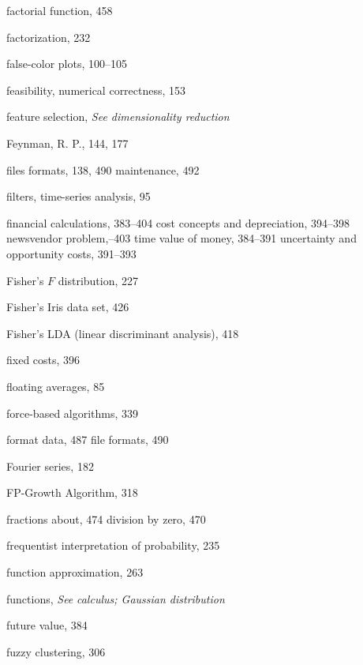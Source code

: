 \documentclass{Oreilly5980006}
\begin{document}
\begin{theindex}
  \item factorial function, 458
  \item factorization, 232
  \item false-color plots, 100--105
  \item feasibility, numerical correctness, 153
  \item feature selection,  {\it See dimensionality reduction} %
   \item Feynman, R. P., 144, 177
  \item files
    \subitem formats, 138, 490
    \subitem maintenance, 492
  \item filters, time-series analysis, 95
  \item financial calculations, 383--404
    \subitem cost concepts and depreciation, 394--398
    \subitem newsvendor problem,--403
    \subitem time value of money, 384--391
    \subitem uncertainty and opportunity costs, 391--393
  \item Fisher's $F$ distribution, 227
  \item Fisher's Iris data set, 426
  \item Fisher's LDA (linear discriminant analysis), 418
  \item fixed costs, 396
  \item floating averages, 85
  \item force-based algorithms, 339
  \item format
    \subitem data, 487
    \subitem file formats, 490
  \item Fourier series, 182
  \item FP-Growth Algorithm, 318
  \item fractions
    \subitem about, 474
    \subitem division by zero, 470
  \item frequentist interpretation of probability, 235
  \item function approximation, 263
  \item functions, 
 {\it See}		{\it calculus; Gaussian distribution}  %
  \item future value, 384
  \item fuzzy clustering, 306

  \indexspace


\end{theindex}
\end{document}
